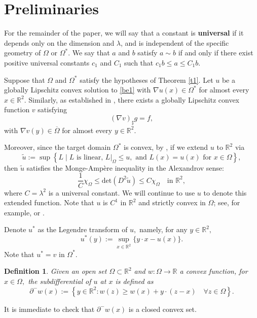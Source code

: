 \documentclass[11pt]{amsart}
\theoremstyle{plain}
\newtheorem{definition}{Definition}[section]
\renewcommand{\det}{\mbox{det}}
\newcommand{\0}{\textbf{0}}
\numberwithin{equation}{section}
\numberwithin{equation}{section}
\numberwithin{figure}{section}
\begin{document}
	
	\section{Preliminaries}\label{S2}
	For the remainder of the paper, we will say that a constant is \textbf{universal} if it depends only on the dimension and $\lambda$, and is independent of the specific geometry of $\Omega$ or $\Omega^*$. We say that $a$ and $b$ satisfy $a \sim b$ if and only if there exist positive universal constants $c_1$ and $C_1$ such that $c_1 b \leq a \leq C_1 b$.  
	
	Suppose that $\Omega$ and $\Omega^*$ satisfy the hypotheses of Theorem \ref{t1}. Let $u$ be a globally Lipschitz convex solution to \eqref{be1} with $\nabla u(x) \in \Omega^*$ for almost every $x \in \mathbb{R}^2$. Similarly, as established in \cite{B}, there exists a globally Lipschitz convex function $v$ satisfying  
	\begin{equation}\label{bre2}
		(\nabla v)_\sharp g = f,
	\end{equation}
	with $\nabla v(y) \in \overline{\Omega}$ for almost every $y \in \mathbb{R}^2$. 
	
	Moreover, since the target domain $\Omega^*$ is convex, by \cite{C92}, if we extend $u$ to $\mathbb{R}^2$ via  
	\begin{equation}\label{extension}
		\tilde{u} := \sup \left\{L \mid L \text{ is linear, } L|_{\Omega} \leq u, \text{ and } L(x) = u(x) \text{ for } x \in \Omega \right\},
	\end{equation}
	then $\tilde{u}$ satisfies the Monge-Ampère inequality in the Alexandrov sense:  
	\begin{equation}\label{global eq}
		\frac{1}{C}\chi_\Omega \leq \det(D^2 \tilde{u}) \leq C\chi_\Omega \quad \text{in } \mathbb{R}^2,
	\end{equation} 
	where $C = \lambda^2$ is a universal constant.  
	We will continue to use $u$ to denote this extended function. Note that $u$ is $C^1$ in $\mathbb{R}^2$ and strictly convex in $\Omega$; see, for example, \cite{C93} or \cite[Lemma 2.3]{Mooney}.  
	
	
	
	
	
	Denote $u^*$ as the Legendre transform of $u,$ namely, for any $y\in \mathbb{R}^2,$
	$$u^*(y):=\sup_{x\in\mathbb{R}^2}\{y\cdot x-u(x)\}.$$
	Note that $u^*=v$ in $\Omega^*.$
	\begin{definition}
		Given an open set $\Omega\subset \mathbb{R}^2$ and $w:\Omega\to \mathbb{R}$ a convex function, for $x\in \Omega,$ the subdifferential of $u$ at $x$ is defined as
		$$ \partial^{-}w(x):=\left\{y\in \mathbb{R}^2:w(z)\geq w(x)+y\cdot (z-x)\quad \forall z\in \Omega\right\}.
		$$
	\end{definition}
	It is immediate to check that $\partial^{-} w(x)$ is a  closed convex set. 
	
\end{document}
